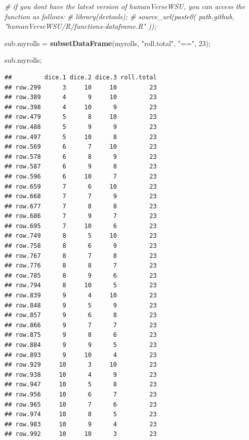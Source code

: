 \documentclass[
]{article}
\newenvironment{Shaded}{\begin{snugshade}}{\end{snugshade}}
\newcommand{\CommentTok}[1]{\textcolor[rgb]{0.56,0.35,0.01}{\textit{#1}}}
\newcommand{\DecValTok}[1]{\textcolor[rgb]{0.00,0.00,0.81}{#1}}
\newcommand{\KeywordTok}[1]{\textcolor[rgb]{0.13,0.29,0.53}{\textbf{#1}}}
\newcommand{\NormalTok}[1]{#1}
\newcommand{\StringTok}[1]{\textcolor[rgb]{0.31,0.60,0.02}{#1}}
\begin{document}
\begin{Shaded}
\begin{Highlighting}[]
\CommentTok{\# if you don\textquotesingle{}t have the latest version of humanVerseWSU, you can access the function as follows:}
\CommentTok{\# library(devtools);}
\CommentTok{\# source\_url(paste0( path.github, "humanVerseWSU/R/functions{-}dataframe.R" ));}



\NormalTok{sub.myrolls =}\StringTok{ }\KeywordTok{subsetDataFrame}\NormalTok{(myrolls, }\StringTok{"roll.total"}\NormalTok{, }\StringTok{"=="}\NormalTok{, }\DecValTok{23}\NormalTok{);}

\NormalTok{sub.myrolls;}
\end{Highlighting}
\end{Shaded}

\begin{verbatim}
##         dice.1 dice.2 dice.3 roll.total
## row.299      3     10     10         23
## row.389      4      9     10         23
## row.398      4     10      9         23
## row.479      5      8     10         23
## row.488      5      9      9         23
## row.497      5     10      8         23
## row.569      6      7     10         23
## row.578      6      8      9         23
## row.587      6      9      8         23
## row.596      6     10      7         23
## row.659      7      6     10         23
## row.668      7      7      9         23
## row.677      7      8      8         23
## row.686      7      9      7         23
## row.695      7     10      6         23
## row.749      8      5     10         23
## row.758      8      6      9         23
## row.767      8      7      8         23
## row.776      8      8      7         23
## row.785      8      9      6         23
## row.794      8     10      5         23
## row.839      9      4     10         23
## row.848      9      5      9         23
## row.857      9      6      8         23
## row.866      9      7      7         23
## row.875      9      8      6         23
## row.884      9      9      5         23
## row.893      9     10      4         23
## row.929     10      3     10         23
## row.938     10      4      9         23
## row.947     10      5      8         23
## row.956     10      6      7         23
## row.965     10      7      6         23
## row.974     10      8      5         23
## row.983     10      9      4         23
## row.992     10     10      3         23
\end{verbatim}
\end{document}
